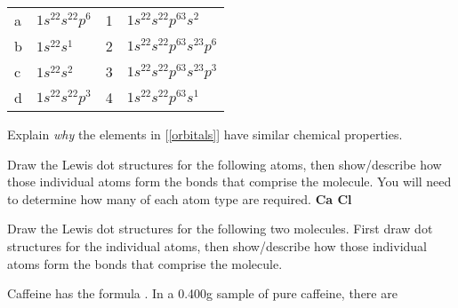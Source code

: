 \documentclass[addpoints, 12pt]{exam}
\begin{document}
\begin{questions}
\begin{tabular}{|l|l|l|l|}
a& $1s^22s^22p^6$ & 1& $1s^22s^22p^63s^2$ \\
b& $1s^22s^1$ & 2& $1s^22s^22p^63s^23p^6$ \\
c& $1s^22s^2$ & 3& $1s^22s^22p^63s^23p^3$ \\
d& $1s^22s^22p^3$ & 4&$1s^22s^22p^63s^1$  
\end{tabular}

\question[5]  Explain \emph{why} the elements in [\ref{orbitals}] have similar
chemical properties.

\vspace{2cm}

\question[10] Draw the Lewis dot structures for the following atoms, then
show/describe how those individual atoms form the bonds that comprise
the molecule.  You will need to determine how many of each atom type
are required.
\textbf{Ca  Cl}
\vspace{1cm}

\question[10] Draw the Lewis dot structures for the following two
molecules.  First draw dot structures for the individual atoms, then
show/describe how those individual atoms form the bonds that comprise
the molecule.


\question[12] Caffeine has the formula . In a 0.400g
sample of pure caffeine, there are
\vspace{3cm}


\end{questions}
\end{document}
